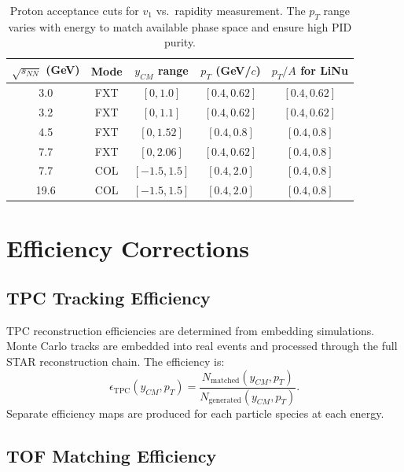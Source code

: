 \documentclass[aps,prc,preprint,superscriptaddress,nofootinbib]{revtex4-2}
\begin{document}
\begin{table}[h]
\centering
\caption{Proton acceptance cuts for $v_1$ vs.\ rapidity measurement. The $p_T$ range varies with energy to match available phase space and ensure high PID purity.}
\label{tab:proton_acceptance}
\begin{tabular}{ccccc}
\toprule
$\sqrt{s_{NN}}$ (GeV) & Mode & $y_{CM}$ range & $p_T$ (GeV/$c$) & $p_T/A$ for LiNu \\
\midrule
3.0  & FXT & $[0, 1.0]$     & $[0.4, 0.62]$ & $[0.4, 0.62]$ \\
3.2  & FXT & $[0, 1.1]$     & $[0.4, 0.62]$ & $[0.4, 0.62]$ \\
4.5  & FXT & $[0, 1.52]$    & $[0.4, 0.8]$  & $[0.4, 0.8]$ \\
7.7  & FXT & $[0, 2.06]$    & $[0.4, 0.62]$ & $[0.4, 0.8]$ \\
7.7  & COL & $[-1.5, 1.5]$  & $[0.4, 2.0]$  & $[0.4, 0.8]$ \\
19.6 & COL & $[-1.5, 1.5]$  & $[0.4, 2.0]$  & $[0.4, 0.8]$ \\
\bottomrule
\end{tabular}
\end{table}

\section{Efficiency Corrections}
\label{sec:efficiency}

\subsection{TPC Tracking Efficiency}

TPC reconstruction efficiencies are determined from embedding simulations. Monte Carlo tracks are embedded into real events and processed through the full STAR reconstruction chain. The efficiency is:
\begin{equation}
    \epsilon_{\text{TPC}}(y_{CM}, p_T) = \frac{N_{\text{matched}}(y_{CM}, p_T)}{N_{\text{generated}}(y_{CM}, p_T)}.
\end{equation}
Separate efficiency maps are produced for each particle species at each energy.

\subsection{TOF Matching Efficiency}
\end{document}
